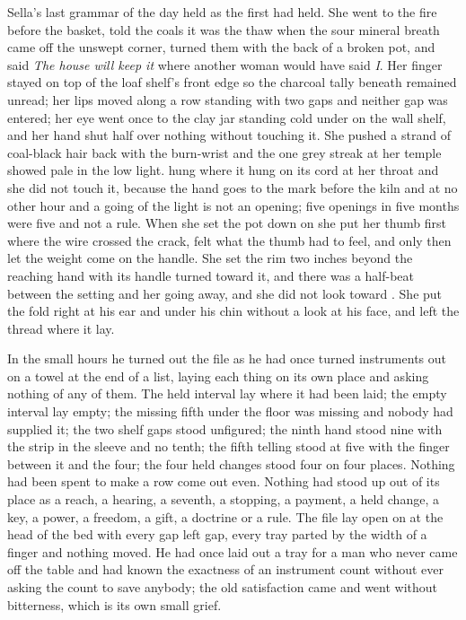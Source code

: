 Sella's last grammar of the day held as the first had held. She went to the fire before the basket, told the coals it was the thaw when the sour mineral breath came off the unswept corner, turned them with the back of a broken pot, and said \emph{The house will keep it} where another woman would have said \emph{I}. Her finger stayed on top of the loaf shelf's front edge so the charcoal tally beneath remained unread; her lips moved along a row standing with two gaps and neither gap was entered; her eye went once to the clay jar standing cold under  on the wall shelf, and her hand shut half over nothing without touching it. She pushed a strand of coal-black hair back with the burn-wrist and the one grey streak at her temple showed pale in the low light.  hung where it hung on its cord at her throat and she did not touch it, because the hand goes to the mark before the kiln and at no other hour and a going of the light is not an opening; five openings in five months were five and not a rule. When she set the pot down on  she put her thumb first where the wire crossed the crack, felt what the thumb had to feel, and only then let the weight come on the handle. She set the rim two inches beyond the reaching hand with its handle turned toward it, and there was a half-beat between the setting and her going away, and she did not look toward . She put the fold right at his ear and under his chin without a look at his face, and left the thread where it lay.

\scenebreak

In the small hours he turned out the file as he had once turned instruments out on a towel at the end of a list, laying each thing on its own place and asking nothing of any of them. The held interval lay where it had been laid; the empty interval lay empty; the missing fifth under the floor was missing and nobody had supplied it; the two shelf gaps stood unfigured; the ninth hand stood nine with the strip in the sleeve and no tenth; the fifth telling stood at five with the finger between it and the four; the four held changes stood four on four places. Nothing had been spent to make a row come out even. Nothing had stood up out of its place as a reach, a hearing, a seventh, a stopping, a payment, a held change, a key, a power, a freedom, a gift, a doctrine or a rule. The file lay open on  at the head of the bed with every gap left gap, every tray parted by the width of a finger and nothing moved. He had once laid out a tray for a man who never came off the table and had known the exactness of an instrument count without ever asking the count to save anybody; the old satisfaction came and went without bitterness, which is its own small grief.

